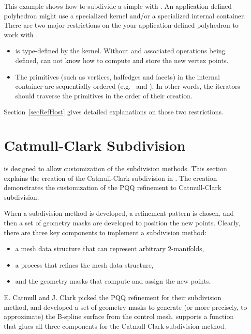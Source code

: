 This example shows how to subdivide a simple 
with .
An application-defined polyhedron might use a specialized kernel and/or
a specialized internal container. There are two major restrictions on the 
your application-defined polyhedron to work with 
.
\begin{itemize}
\item
{} is type-defined by the kernel. Without  
and associated operations being defined,  
can not know how to compute and store the new vertex points.
\item
The primitives (such as vertices, halfedges and facets) 
in the internal container are sequentially ordered (e.g.~
 and ).
In other words, the iterators should traverse the primitives in 
the order of their creation. 
\end{itemize}

Section~\ref{secRefHost} gives detailed explanations on those 
two restrictions.

\section{Catmull-Clark Subdivision}
\label{secCC}
 is designed to allow customization of 
the subdivision methods. This section explains the creation
of the Catmull-Clark subdivision in .
The creation demonstrates the customization of the PQQ refinement 
to Catmull-Clark subdivision. 

When a subdivision method is developed, a refinement pattern is 
chosen, and then a set of geometry masks are developed to 
position the new points. Clearly, there are three key components 
to implement a subdivision method: 
\begin{itemize}
\item
a mesh data structure that can represent arbitrary 2-manifolds, 
\item
a process that refines the mesh data structure, 
\item
and the geometry masks that compute and assign the new points.
\end{itemize}

E. Catmull and J. Clark picked the
PQQ refinement for their subdivision method,
and developed a set of geometry masks to generate (or more 
precisely, to approximate) the B-spline surface from 
the control mesh.
 supports a function that glues all 
three components for the Catmull-Clark subdivision method.

